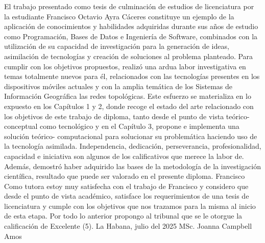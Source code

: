 \begin{opinion}
    El trabajo presentado como tesis de culminación de estudios de licenciatura por la estudiante Francisco Octavio Ayra Cáceres  constituye un ejemplo de la aplicación de conocimientos y habilidades adquiridas durante sus años de estudio como Programación, Bases de Datos e Ingeniería  de Software, combinados con la utilización de su capacidad de investigación para la generación de ideas, asimilación de tecnologías y creación de soluciones al problema planteado.
    Para cumplir con los objetivos propuestos, realizó una ardua labor investigativa en temas totalmente nuevos para él, relacionados con las tecnologías presentes en los dispositivos móviles actuales y con la amplia temática de los Sistemas de Información Geográfica  las redes topológicas.
    Este esfuerzo se materializa en lo expuesto en los Capítulos 1 y 2, donde recoge el estado del arte relacionado con los objetivos de este trabajo de diploma, tanto desde el punto de vista teórico-conceptual como tecnológico y en el Capítulo 3, propone e implementa  una solución teórico- computacional  para solucionar su problemática haciendo uso de la tecnología asimilada. Independencia, dedicación, perseverancia, profesionalidad, capacidad e iniciativa son algunos de los calificativos que merece la labor de. Además, demostró haber adquirido las bases de la metodología de la investigación científica, resultado que puede ser valorado en el presente diploma. Francisco
    Como tutora estoy muy satisfecha con el trabajo de Francisco y considero que desde el punto de vista académico, satisface los requerimientos de una tesis de licenciatura y cumple con los objetivos que nos trazamos para la misma al inicio de esta etapa.
    Por todo lo anterior propongo al tribunal que se le otorgue la calificación de Excelente (5).
    La Habana, julio del 2025
    MSc. Joanna Campbell Amos

\end{opinion}